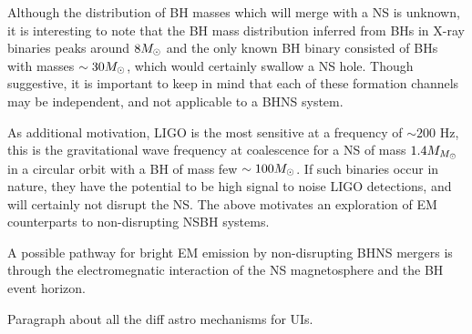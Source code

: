 Although the distribution of BH masses which will merge with
a NS is unknown, it is interesting to note that the BH mass distribution
inferred from BHs in X-ray binaries peaks around $8 {M_{\odot}}$ \citep{Orzel:2010}
and the only known BH binary consisted of BHs with masses $\sim 30 {M_{\odot}}$, which
would certainly swallow a NS hole. Though suggestive, it is important to keep
in mind that each of these formation channels may be independent, and not
applicable to a BHNS system.

As additional motivation, LIGO is the most sensitive at a frequency of $\sim
200$ Hz, this is the gravitational wave frequency at coalescence for a NS of
mass $1.4 M_{{M_{\odot}}}$ in a circular orbit with a BH of mass few $\sim100
{M_{\odot}}$. If such binaries occur in nature, they have the potential to be high
signal to noise LIGO detections, and will certainly not disrupt the NS. The
above motivates an exploration of EM counterparts to non-disrupting NSBH
systems.


A possible pathway for bright EM emission by non-disrupting BHNS mergers is
through the electromegnatic interaction of the NS magnetosphere and the BH
event horizon. 

Paragraph about all the diff astro mechanisms for UIs.

